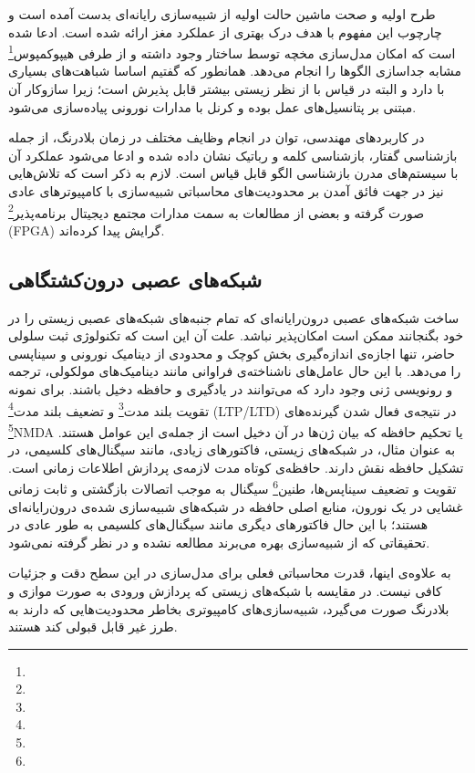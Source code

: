 طرح اولیه و صحت ماشین حالت اولیه از شبیه‌سازی رایانه‌ای بدست آمده است و چارچوب این مفهوم با هدف درک بهتری از عملکرد مغز ارائه شده است. ادعا شده است که امکان مدل‌سازی مخچه توسط ساختار  وجود داشته\cite{yamazaki2007cerebellum} و از طرفی هیپوکمپوس\footnote{} مشابه  جداسازی الگوها را انجام می‌دهد\cite{baker2003there,bakker2008pattern}. همانطور که گفتیم  اساسا شباهت‌های بسیاری با  دارد و البته  در قیاس با  از نظر زیستی بیشتر قابل پذیرش است؛ زیرا سازوکار آن مبتنی بر پتانسیل‌های عمل بوده و کرنل با مدارات نورونی پیاده‌سازی می‌شود. 

در کاربرد‌های مهندسی، توان  در انجام وظایف مختلف در زمان بلادرنگ، از جمله بازشناسی گفتار\cite{schrauwen2008compact}، بازشناسی کلمه\cite{verstraeten2005isolated} و رباتیک\cite{joshi2004movement} نشان داده شده و ادعا می‌شود عملکرد آن با سیستم‌های مدرن بازشناسی الگو قابل قیاس است. لازم به ذکر است که تلاش‌هایی نیز در جهت فائق آمدن بر محدودیت‌های محاسباتی شبیه‌سازی با کامپیوتر‌های عادی صورت گرفته و بعضی از مطالعات به سمت مدارات مجتمع دیجیتال برنامه‌پذیر\footnote{} (FPGA) گرایش پیدا کرده‌اند. 

\subsection{شبکه‌های عصبی درون‌کشتگاهی}
ساخت شبکه‌های عصبی درون‌رایانه‌ای که تمام جنبه‌های شبکه‌های عصبی زیستی را در خود بگنجانند ممکن است امکان‌پذیر نباشد. علت آن این است که تکنولوژی ثبت سلولی حاضر، تنها اجازه‌ی اندازه‌گیری بخش کوچک و محدودی از دینامیک نورونی و سیناپسی را می‌دهد. با این حال عامل‌های ناشناخته‌ی فراوانی مانند دینامیک‌های مولکولی، ترجمه و رونویسی ژنی وجود دارد که می‌توانند در یادگیری و حافظه دخیل باشند. برای نمونه تقویت بلند مدت\footnote{} و تضعیف بلند مدت\footnote{} (LTP/LTD) در نتیجه‌ی فعال شدن گیرنده‌های \footnote{}NMDA یا تحکیم حافظه که بیان ژن‌ها در آن دخیل است از جمله‌ی این عوامل هستند. به عنوان مثال، در شبکه‌های زیستی، فاکتور‌های زیادی، مانند سیگنال‌های کلسیمی، در تشکیل حافظه نقش دارند. حافظه‌ی کوتاه مدت لازمه‌ی پردازش اطلاعات زمانی است. تقویت و تضعیف سیناپس‌ها، طنین\footnote{} سیگنال به موجب اتصالات بازگشتی و ثابت زمانی غشایی در یک نورون، منابع اصلی حافظه در شبکه‌های شبیه‌سازی شده‌ی درون‌رایانه‌ای هستند؛ با این حال فاکتور‌های دیگری مانند سیگنال‌های کلسیمی به طور عادی در تحقیقاتی که از شبیه‌سازی بهره می‌برند مطالعه نشده و در نظر گرفته نمی‌شود.

به علاوه‌ی اینها، قدرت محاسباتی فعلی برای مدل‌سازی در این سطح دقت و جزئیات کافی نیست. در مقایسه با شبکه‌های زیستی که پردازش ورودی به صورت موازی و بلادرنگ صورت می‌گیرد، شبیه‌سازی‌های کامپیوتری بخاطر محدودیت‌هایی که دارند به طرز غیر قابل قبولی کند هستند.

